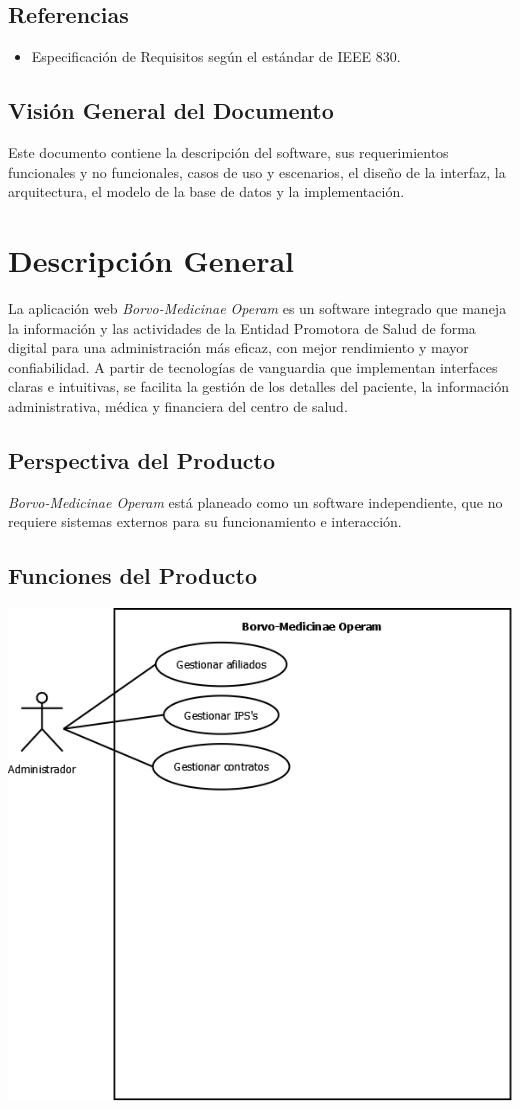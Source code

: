\documentclass[12pt,a4paper]{article}
\begin{document}
\subsection{Referencias}
\begin{itemize}
\item Especificación de Requisitos según el estándar de IEEE 830.
\end{itemize}
\subsection{Visión General del Documento}
Este documento contiene la descripción del software, sus requerimientos funcionales y no funcionales, casos de uso y escenarios, el diseño de la interfaz, la arquitectura, el modelo de la base de datos y la implementación.
\section{Descripción General}
La aplicación web \emph{Borvo-Medicinae Operam} es un software integrado que maneja la información y las actividades de la Entidad Promotora de Salud de forma digital para una administración más eficaz, con mejor rendimiento y mayor confiabilidad. A partir de tecnologías de vanguardia que implementan interfaces claras e intuitivas, se facilita la gestión de los detalles del paciente, la información administrativa, médica y financiera del centro de salud.
\subsection{Perspectiva del Producto}
\emph{Borvo-Medicinae Operam} está planeado como un software independiente, que no requiere sistemas externos para su funcionamiento e interacción. 
\subsection{Funciones del Producto}
\vspace{5mm}
{\includegraphics[width=1 \textwidth]{IMAGES/use_cases_diagram.png} \par}
\end{document}
